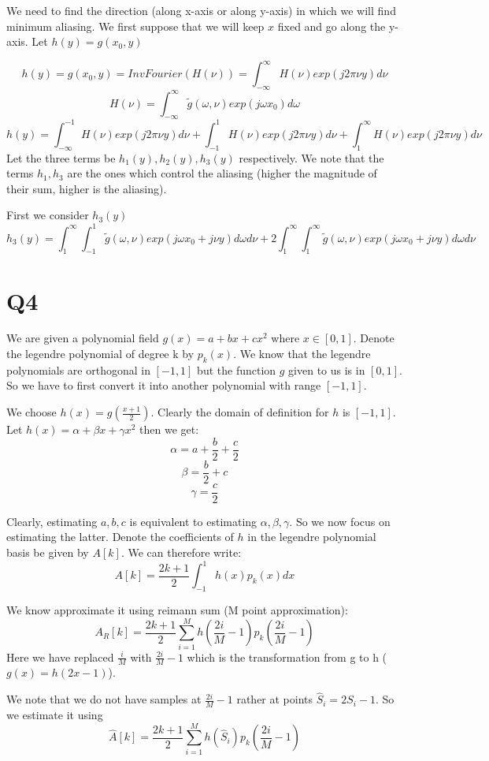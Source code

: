\documentclass{article}
\begin{document}
We need to find the direction (along x-axis or along y-axis) in which we will find minimum aliasing. We first suppose that we will keep $x$ fixed and go along the y-axis. Let $h(y) = g(x_0, y)$

$$h(y) = g(x_0, y) = InvFourier(H(\nu)) = \int_{-\infty}^{\infty}H(\nu) exp(j2\pi \nu y) d\nu$$
$$H(\nu) = \int_{-\infty}^{\infty}\tilde{g}(\omega, \nu) exp(j \omega x_0) d\omega$$
$$h(y) = \int_{-\infty}^{-1}H(\nu) exp(j2\pi \nu y) d\nu + \int_{-1}^{1}H(\nu) exp(j2\pi \nu y) d\nu + \int_{1}^{\infty}H(\nu) exp(j2\pi \nu y) d\nu$$
Let the three terms be $h_1(y), h_2(y), h_3(y)$ respectively. We note that the terms $h_1, h_3$ are the ones which control the aliasing (higher the magnitude of their sum, higher is the aliasing).

First we consider $h_3(y)$
$$h_3(y) = \int_{1}^{\infty} \int_{-1}^{1} \tilde{g}(\omega, \nu) exp(j\omega x_0 + j \nu y)d\omega d\nu + 2 \int_{1}^{\infty} \int_{1}^{\infty} \tilde{g}(\omega, \nu) exp(j \omega x_0 + j \nu y)d\omega d\nu$$
\section*{Q4}
We are given a polynomial field $g(x) = a + bx + cx^2$ where $x \in [0, 1]$. Denote the legendre polynomial of degree k by $p_k(x)$. We know that the legendre polynomials are orthogonal in $[-1, 1]$ but the function $g$ given to  us is in $[0, 1]$. So we have to first convert it into another polynomial with range $[-1, 1]$.

We choose $h(x) = g(\frac{x+1}{2})$. Clearly the domain of definition for $h$ is $[-1, 1]$. Let $h(x) = \alpha + \beta x + \gamma x^2$ then we get:
$$\alpha = a + \frac{b}{2} + \frac{c}{2}$$
$$\beta = \frac{b}{2} + c$$
$$\gamma = \frac{c}{2}$$

Clearly, estimating $a, b, c$ is equivalent to estimating $\alpha, \beta, \gamma$. So we now focus on estimating the latter. Denote the coefficients of $h$ in the legendre polynomial basis be given by $A[k]$. We can therefore write:
$$A[k] = \frac{2k+1}{2} \int_{-1}^1 h(x) p_k(x) dx$$

We know approximate it using reimann sum (M point approximation):
$$A_R[k] = \frac{2k+1}{2} \sum_{i=1}^M h(\frac{2i}{M}-1) p_k(\frac{2i}{M} -1)$$
Here we have replaced $\frac{i}{M}$ with $\frac{2i}{M}-1$ which is the transformation from g to h ($g(x) = h(2x-1)$).

We note that we do not have samples at $\frac{2i}{M} -1$ rather at points $\hat{S}_i = 2 S_i - 1$. So we estimate it using
$$\hat{A}[k] = \frac{2k+1}{2} \sum_{i=1}^M h(\hat{S}_i) p_k(\frac{2i}{M} -1)$$
\end{document}
